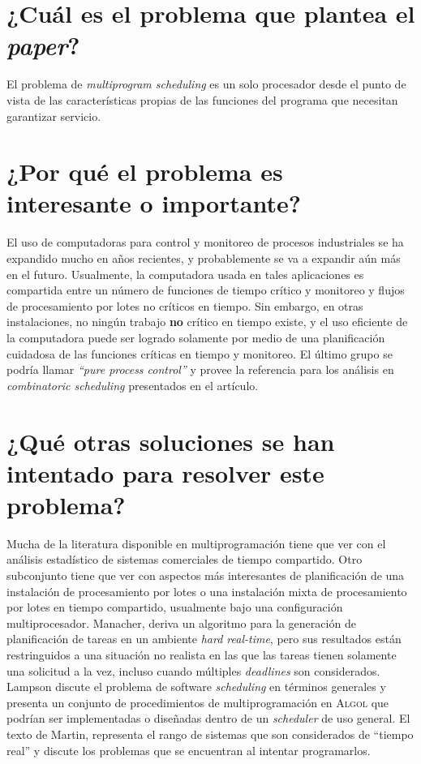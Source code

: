 \section{¿Cuál es el problema que plantea el \textit{paper}?}
El problema de \emph{multiprogram scheduling} es un solo procesador desde el punto de vista de las características propias de las funciones del programa que necesitan garantizar servicio.  

\section{¿Por qué el problema es interesante o importante?}
El uso de computadoras para control y monitoreo de procesos industriales se ha expandido mucho en años recientes, y probablemente se va a expandir aún más en el futuro. Usualmente, la computadora usada en tales aplicaciones es compartida entre un número de funciones de tiempo crítico y monitoreo y flujos de procesamiento por lotes no críticos en tiempo. Sin embargo, en otras instalaciones, no ningún trabajo \textbf{no} crítico en tiempo existe, y el uso eficiente de la computadora puede ser logrado solamente por medio de una planificación cuidadosa de las funciones críticas en tiempo y monitoreo. El último grupo se podría llamar \emph{``pure process control''} y provee la referencia para los análisis en \emph{combinatoric scheduling} presentados en el artículo.

\section{¿Qué otras soluciones se han intentado para resolver este problema?}
Mucha de la literatura disponible en multiprogramación tiene que ver con el análisis estadístico de sistemas comerciales de tiempo compartido. Otro subconjunto tiene que ver con aspectos más interesantes de planificación de una instalación de procesamiento por lotes o una instalación mixta de procesamiento por lotes en tiempo compartido, usualmente bajo una configuración multiprocesador. Manacher, deriva un algoritmo para la generación de planificación de tareas en un ambiente \emph{hard real-time}, pero sus resultados están restringuidos a una situación no realista en las que las tareas tienen solamente una solicitud a la vez, incluso cuando múltiples \emph{deadlines} son considerados. Lampson discute el problema de software \emph{scheduling} en términos generales y presenta un conjunto de procedimientos de multiprogramación en \textsc{Algol} que podrían ser implementadas o diseñadas dentro de un \emph{scheduler} de uso general. El texto de Martin, representa el rango de sistemas que son considerados de ``tiempo real'' y discute los problemas que se encuentran al intentar programarlos.

